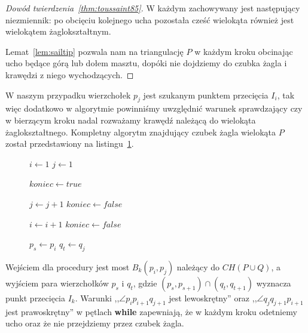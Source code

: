 \begin{proof}[Dowód twierdzenia~\ref{thm:toussaint85}]
  W każdym zachowywany jest następujący niezmiennik: po obcięciu
  kolejnego ucha pozostała cześć wielokąta również jest wielokątem
  żaglokształtnym.

  Lemat~\ref{lem:sailtip} pozwala nam na triangulację $P$ w każdym
  kroku obcinając ucho będące górą lub dołem masztu, dopóki nie
  dojdziemy do czubka żagla i krawędzi z niego wychodzących.
\end{proof}

W naszym przypadku wierzchołek $p_j$ jest szukanym punktem przecięcia
$I_i$, tak więc dodatkowo w algorytmie powinniśmy uwzględnić warunek
sprawdzający czy w bierzącym kroku nadal rozważamy krawędź należącą do
wielokąta żaglokształtnego. Kompletny algorytm znajdujący czubek żagla
wielokąta $P$ został przedstawiony na listingu~\ref{alg:stepdown}.

\begin{figure}[htp]
  \begin{algorithmic}[1]

    \State $i \gets 1$
    \State $j \gets 1$


    \Repeat
    \State $koniec \gets true$


    \State $j \gets j + 1$
    \State $koniec \gets false$
    \EndWhile


    \State $i \gets i + 1$
    \State $koniec \gets false$
    \EndWhile



    \State $p_s \gets p_i$
    \State $q_t \gets q_j$

    \EndProcedure
  \end{algorithmic}
  \caption{\label{alg:stepdown}}
\end{figure}

Wejściem dla procedury jest most $B_k(p_i,p_j)$ należący do $CH(P \cup
Q)$, a wyjściem para wierzchołków $p_s$ i $q_t$, gdzie $(p_s,p_{s+1})
\cap (q_t,q_{t+1})$ wyznacza punkt przecięcia $I_k$. Warunki ,,$\angle
p_{i}p_{i+1}q_{j+1}$ jest lewoskrętny'' oraz ,,$\angle
q_{j}q_{j+1}p_{i+1}$ jest prawoskrętny'' w pętlach \textbf{while}
zapewniają, że w każdym kroku odetniemy ucho oraz że nie przejdziemy
przez czubek żagla.

